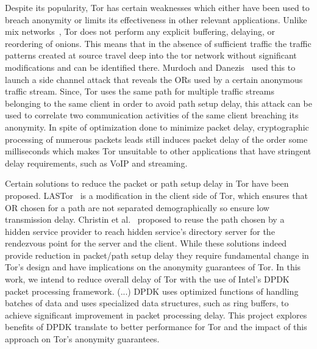 Despite its popularity, Tor has certain weaknesses which either have been used to breach anonymity or limits its effectiveness in other relevant applications. Unlike mix networks~\cite{Chaum:1981:UEM:358549.358563}, Tor does not perform any explicit buffering, delaying, or reordering of onions. This means that in the absence of sufficient traffic the traffic patterns created at source travel deep into the tor network without significant modifications and can be identified there. Murdoch and Danezis~\cite{Murdoch:2005:LTA:1058433.1059390} used this to launch a side channel attack that reveals the ORs used by a certain anonymous traffic stream. Since, Tor uses the same path for multiple traffic streams belonging to the same client in order to avoid path setup delay, this attack can be used to correlate two communication activities of the same client breaching its anonymity. In spite of optimization done to minimize packet delay, cryptographic processing of numerous packets leads still induces packet delay of the order some milliseconds which makes Tor unsuitable to other applications that have stringent  delay requirements, such as VoIP and streaming. 

Certain solutions to reduce the packet or path setup delay in Tor have been proposed. LASTor~\cite{6679287} is a modification in the client side of Tor, which ensures that OR chosen for a path are not separated demographically so ensure low transmission delay. Christin et al.~\cite{Christin2013} proposed to reuse the path chosen by a hidden service provider to reach hidden service's directory server for the rendezvous point for the server and the client. While these solutions indeed provide reduction in packet/path setup delay they require fundamental change in Tor's design and have  implications on the anonymity guarantees of Tor. In this work, we intend to reduce overall delay of Tor with the use of Intel's DPDK packet processing framework. (...) DPDK uses optimized functions of handling batches of data and uses specialized data structures, such as ring buffers, to achieve significant improvement in packet processing delay. This project explores benefits of DPDK translate to better performance for Tor and the impact of this approach on Tor's anonymity guarantees. 

